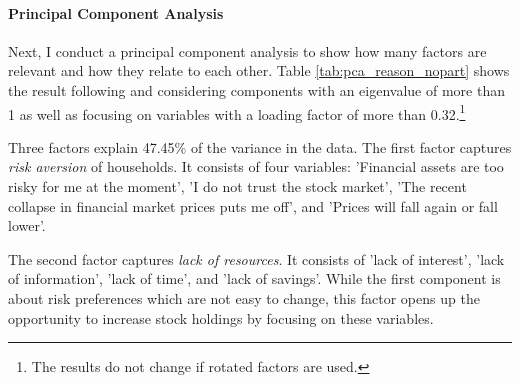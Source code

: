 \documentclass[ProjectABM]{subfiles}
\begin{document}



\paragraph{Principal Component Analysis}

Next, I conduct a principal component analysis to show how many factors are relevant and how they relate to each other. Table \ref{tab:pca_reason_nopart} shows the result following \cite{choi_2020, tabachnick_fidell_2007} and considering components with an eigenvalue of more than 1 as well as focusing on variables with a loading factor of more than 0.32.\footnote{The results do not change if rotated factors are used.}

Three factors explain 47.45\% of the variance in the data. The first factor captures \textit{risk aversion} of households. It consists of four variables: 'Financial assets are too risky for me at the moment', 'I do not trust the stock market', 'The recent collapse in financial market prices puts me off', and 'Prices will fall again or fall lower'. 

The second factor captures \textit{lack of resources}. It consists of 'lack of interest', 'lack of information', 'lack of time', and 'lack of savings'. While the first component is about risk preferences which are not easy to change, this factor opens up the opportunity to increase stock holdings by focusing on these variables.
\end{document}
